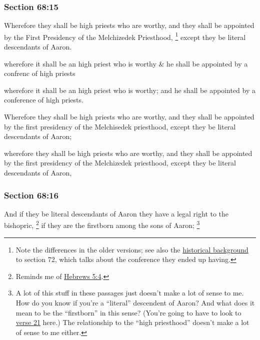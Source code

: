 	\subsubsection{Section 68:15} %
		\label{DC68-15}

		Wherefore they shall be high priests who are worthy, and they shall be appointed by the First Presidency of the Melchizedek Priesthood,%
			\footnote{%
				Note the differences in the older versions; see also the \hyperref[DC72-HB]{historical background} to section 72, which talks about the conference they ended up having.
				} 
		except they be literal descendants of Aaron.

		\begin{framed}
		\scriptsize
			\begin{compactdesc}
				\item[JSP] wherefore it shall be an high priest who is worthy \& he shall be appointed by a confrenc of high priests
				\item[EMS] wherefore it shall be an high priest who is worthy; and he shall be appointed by a conference of high priests.
				\item[EMS-R] Wherefore they shall be high priests who are worthy, and they shall be appointed by the first presidency of the Melchisedek priesthood, except they be literal descendants of Aaron;
				\item[DC 1835] wherefore they shall be high priests who are worthy, and they shall be appointed by the first presidency of the Melchizedek priesthood, except they be literal descendants of Aaron,
			\end{compactdesc}
		\end{framed}

	\subsubsection{Section 68:16} %
		\label{DC68-16}

		And if they be literal descendants of Aaron they have a legal right to the bishopric,%
			\footnote{%
				Reminds me of \hyperref[HEBREWS-5-4]{Hebrews 5:4}.
				}
		if they are the firstborn among the sons of Aaron;%
			\footnote{%
				A lot of this stuff in these passages just doesn't make a lot of sense to me. How do you know if you're a ``literal'' descendent of Aaron? And what does it mean to be the ``firstborn'' in this sense? (You're going to have to look to \hyperref[DC68-21]{verse 21} here.) The relationship to the ``high priesthood'' doesn't make a lot of sense to me either.
				}

